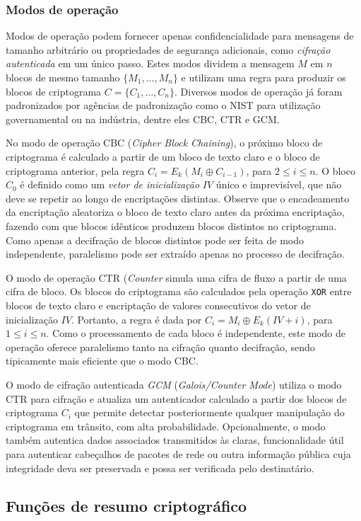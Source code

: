 \subsubsection*{Modos de operação}

Modos de operação podem fornecer apenas confidencialidade para mensagens de tamanho arbitrário ou propriedades de segurança adicionais, como \emph{cifração autenticada} em um único passo. Estes modos dividem a mensagem $M$ em $n$ blocos de mesmo tamanho $\{M_1, \ldots, M_n\}$ e utilizam uma regra para produzir os blocos de criptograma $C = \{C_1, \ldots, C_n\}$. Diversos modos de operação já foram padronizados por agências de padronização como o NIST para utilização governamental ou na indústria, dentre eles CBC, CTR e GCM.

No modo de operação CBC (\emph{Cipher Block Chaining}), o próximo bloco de criptograma é calculado a partir de um bloco de texto claro e o bloco de criptograma anterior, pela regra $C_i = E_k(M_i \oplus C_{i-1})$, para $2 \leq i \leq n$. O bloco $C_0$ é definido como um \emph{vetor de inicialização} $IV$ único e imprevisível, que não deve se repetir ao longo de encriptações distintas. Observe que o encadeamento da encriptação aleatoriza o bloco de texto claro antes da próxima encriptação, fazendo com que blocos idênticos produzem blocos distintos no criptograma. Como apenas a decifração de blocos distintos pode ser feita de modo independente, paralelismo pode ser extraído apenas no processo de decifração.

O modo de operação CTR (\emph{Counter} simula uma cifra de fluxo a partir de uma cifra de bloco. Os blocos do criptograma são calculados pela operação \texttt{XOR} entre blocos de texto claro e encriptação de valores consecutivos do vetor de inicialização $IV$. Portanto, a regra é dada por $C_i = M_i \oplus E_k(IV + i)$, para $1 \leq i \leq n$. Como o processamento de cada bloco é independente, este modo de operação oferece paralelismo tanto na cifração quanto decifração, sendo tipicamente mais eficiente que o modo CBC.

O modo de cifração autenticada \emph{GCM} (\emph{Galois/Counter Mode}) utiliza o modo CTR para cifração e atualiza um autenticador calculado a partir dos blocos de criptograma $C_i$ que permite detectar posteriormente qualquer manipulação do criptograma em trânsito, com alta probabilidade. Opcionalmente, o modo também autentica dados associados transmitidos às claras, funcionalidade útil para autenticar cabeçalhos de pacotes de rede ou outra informação pública cuja integridade deva ser preservada e possa ser verificada pelo destinatário.

\subsection{Funções de resumo criptográfico}









